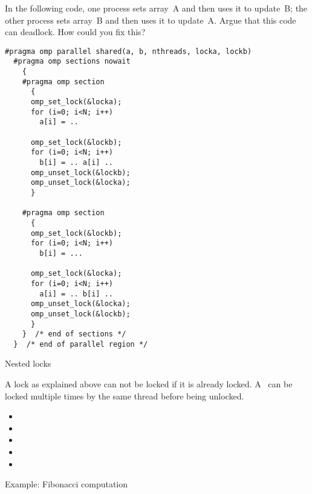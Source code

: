 \begin{exercise}
  \label{ex:loc-deadlock}
  In the following code, one process sets array~A and then uses it to
  update~B; the other process sets array~B and then uses it to
  update~A.
  Argue that this code can deadlock. How could you fix this?
\begin{lstlisting}
#pragma omp parallel shared(a, b, nthreads, locka, lockb)
  #pragma omp sections nowait
    {
    #pragma omp section
      {
      omp_set_lock(&locka);
      for (i=0; i<N; i++)
        a[i] = ..

      omp_set_lock(&lockb);
      for (i=0; i<N; i++)
        b[i] = .. a[i] ..
      omp_unset_lock(&lockb);
      omp_unset_lock(&locka);
      }

    #pragma omp section
      {
      omp_set_lock(&lockb);
      for (i=0; i<N; i++)
        b[i] = ...

      omp_set_lock(&locka);
      for (i=0; i<N; i++)
        a[i] = .. b[i] ..
      omp_unset_lock(&locka);
      omp_unset_lock(&lockb);
      }
    }  /* end of sections */
  }  /* end of parallel region */
\end{lstlisting}
\end{exercise}

 {Nested locks}

A lock as explained above can not be locked if it is already locked.
A~ can be locked multiple times by the same
thread before being unlocked.

\begin{itemize}
\item {}
\item {}
\item {}
\item {}
\item {}
\end{itemize}


 {Example: Fibonacci computation}

